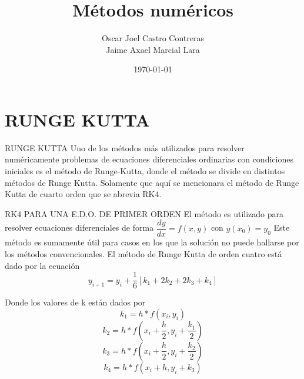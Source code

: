 \documentclass[11pt]{beamer}
\author[Oscar y Jaime]{Oscar Joel Castro Contreras \\ Jaime Axael Marcial Lara}
\title{Métodos numéricos}
\institute{Universidad Autónoma de Coahuila}
\date{\today}
\begin{document}

	\begin{frame}
		\titlepage
	\end{frame}

	\begin{frame}
		\tableofcontents
	\end{frame}

	\section{RUNGE KUTTA}
		\begin{frame}{RUNGE KUTTA}
			Uno de los métodos más utilizados para resolver numéricamente problemas de ecuaciones 
			diferenciales ordinarias con condiciones iniciales es el método de Runge-Kutta, donde el método se 
			divide en distintos métodos de Runge Kutta. Solamente que aquí se mencionara el método de Runge 
			Kutta de cuarto orden que se abrevia RK4.
		\end{frame}
		
		\begin{frame}{RK4 PARA UNA E.D.O. DE PRIMER ORDEN}
			El método es utilizado para resolver ecuaciones diferenciales de forma
			$\dfrac{dy}{dx} = f(x,y)$ con $y(x_0) = y_0$
			Este método es sumamente útil para casos en los que la solución no puede hallarse por los métodos 
			convencionales. El método de Runge Kutta de orden cuatro está dado por la ecuación 
			$$y_{i+1} = y_i +\dfrac{1}{6}[k_1 + 2k_2 + 2k_3 + k_4]$$
		\end{frame}
		
		\begin{frame}
			Donde los valores de k están dados por 
			$$k_1 = h*f(x_i,y_i)$$
			$$k_2 = h*f(x_i+\dfrac{h}{2},y_i +\dfrac{k_1}{2})$$
			$$k_3 = h*f(x_i+\dfrac{h}{2},y_i +\dfrac{k_2}{2})$$
			$$k_4 = h*f(x_i+h,y_i + k_3)$$		
		\end{frame}
		
\end{document}
